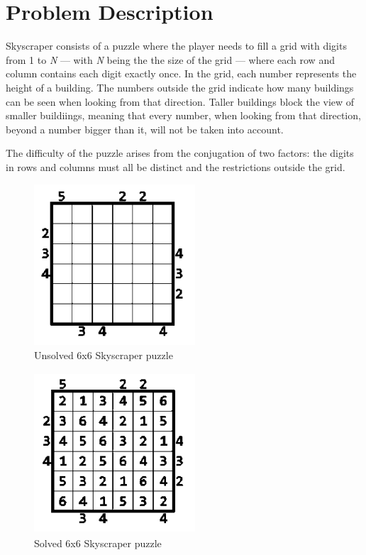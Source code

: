 \documentclass{llncs}
\begin{document}
%
\section{Problem Description}
%
Skyscraper consists of a puzzle where the player needs to fill a grid with digits from 1 to \textit{N} --- with \textit{N} being the the size of the grid --- where each row and column contains each digit exactly once. In the grid, each number represents the height of a building. The numbers outside the grid indicate how many buildings can be seen when looking from that direction. Taller buildings block the view of smaller buildiings, meaning that every number, when looking from that direction, beyond a number bigger than it, will not be taken into account.

The difficulty of the puzzle arises from the conjugation of two factors: the digits in rows and columns must all be distinct and the restrictions outside the grid.

\begin{figure}[h!]
\begin{center}
\includegraphics[height=6cm,width=6cm]{images/skyscraper_unsolved.png}
\caption{Unsolved 6x6 Skyscraper puzzle}
\label{Figure 1}
\end{center}
\end{figure}

\begin{figure}[h!]
\begin{center}
\includegraphics[height=6cm,width=6cm]{images/skyscraper_solved.png}
\caption{Solved 6x6 Skyscraper puzzle}
\label{Figure 2}
\end{center}
\end{figure}
\end{document}
